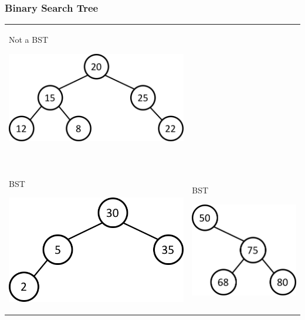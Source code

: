 \documentclass[newPxFont,sthlmFooter,nooffset]{beamer}
\begin{document}
\begin{frame}[t]
  \frametitle{Binary Search Tree}
  \begin{tabular}{p{} p{}}
Not a BST

    \includegraphics[height=0.3\textheight]{./figures/fig15_bst.png}
&   ~\\
~& ~\\
BST

    \includegraphics[height=0.3\textheight]{./figures/fig15_bst1.png}
&
BST

    \includegraphics[height=0.3\textheight]{./figures/fig15_bst2.png}
\\
  \end{tabular}
\end{frame}
\end{document}
